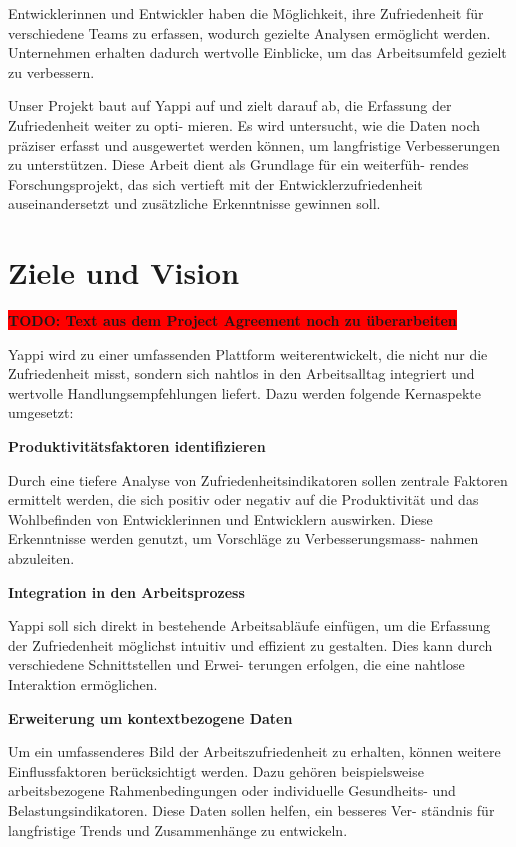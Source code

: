 \documentclass[12pt,a4paper]{report}
\newcommand{\todo}[1]{\colorbox{red}{\textbf{TODO: #1}}}
\begin{document}
Entwicklerinnen und Entwickler haben die Möglichkeit, ihre Zufriedenheit für verschiedene Teams zu
erfassen, wodurch gezielte Analysen ermöglicht werden. Unternehmen erhalten dadurch wertvolle
Einblicke, um das Arbeitsumfeld gezielt zu verbessern.

Unser Projekt baut auf Yappi auf und zielt darauf ab, die Erfassung der Zufriedenheit weiter zu opti-
mieren. Es wird untersucht, wie die Daten noch präziser erfasst und ausgewertet werden können,
um langfristige Verbesserungen zu unterstützen. Diese Arbeit dient als Grundlage für ein weiterfüh-
rendes Forschungsprojekt, das sich vertieft mit der Entwicklerzufriedenheit auseinandersetzt und
zusätzliche Erkenntnisse gewinnen soll.

\section{Ziele und Vision}

\todo{Text aus dem Project Agreement noch zu überarbeiten}

Yappi wird zu einer umfassenden Plattform weiterentwickelt, die nicht nur die Zufriedenheit misst,
sondern sich nahtlos in den Arbeitsalltag integriert und wertvolle Handlungsempfehlungen liefert.
Dazu werden folgende Kernaspekte umgesetzt:

\textbf{Produktivitätsfaktoren identifizieren}

Durch eine tiefere Analyse von Zufriedenheitsindikatoren sollen zentrale Faktoren ermittelt werden,
die sich positiv oder negativ auf die Produktivität und das Wohlbefinden von Entwicklerinnen und
Entwicklern auswirken. Diese Erkenntnisse werden genutzt, um Vorschläge zu Verbesserungsmass-
nahmen abzuleiten.

\textbf{Integration in den Arbeitsprozess}

Yappi soll sich direkt in bestehende Arbeitsabläufe einfügen, um die Erfassung der Zufriedenheit
möglichst intuitiv und effizient zu gestalten. Dies kann durch verschiedene Schnittstellen und Erwei-
terungen erfolgen, die eine nahtlose Interaktion ermöglichen.

\textbf{Erweiterung um kontextbezogene Daten}

Um ein umfassenderes Bild der Arbeitszufriedenheit zu erhalten, können weitere Einflussfaktoren
berücksichtigt werden. Dazu gehören beispielsweise arbeitsbezogene Rahmenbedingungen oder
individuelle Gesundheits- und Belastungsindikatoren. Diese Daten sollen helfen, ein besseres Ver-
ständnis für langfristige Trends und Zusammenhänge zu entwickeln.
\end{document}

